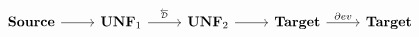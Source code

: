 \[
\begin{tikzcd}
    \Source \ar[r] & \UNFSymbol_1 \ar[r,"\Dsynrevsymbol"] & \UNFSymbol_2 \ar[r] & \Target \ar[r,"\partial ev"] & \Target
\end{tikzcd}
\]
